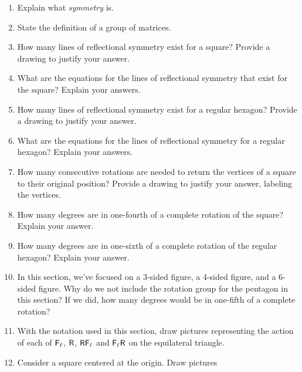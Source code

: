 \problems
\begin{enumerate}
\item Explain what \textit{symmetry} is.
\item State the definition of a group of matrices.
\item How many lines of reflectional symmetry exist for a square?
  Provide a drawing to justify your answer.
\item What are the equations for the lines of reflectional symmetry that exist for
  the square? Explain your answers.
\item How many lines of reflectional symmetry exist for a regular hexagon?  Provide a
  drawing to justify your answer.
\item What are the equations for the lines of reflectional symmetry
  for a regular hexagon?  Explain your answers.
\item How many consecutive rotations are needed to return the vertices
  of a square to their original position? Provide a drawing to justify
  your answer, labeling the vertices.
\item How many degrees are in one-fourth of a complete rotation of the
  square?  Explain your answer.
\item How many degrees are in one-sixth of a complete rotation of the
  regular hexagon?  Explain your answer.
\item In this section, we've focused on a 3-sided figure, a 4-sided
  figure, and a 6-sided figure.  Why do we not include the rotation
  group for the pentagon in this section?  If we did, how many degrees
  would be in one-fifth of a complete rotation?
\item With the notation used in this section, draw pictures representing
  the action of each of $\mathsf{F}_\ell$, $\mathsf{R}$,
  $\mathsf{R}\mathsf{F}_\ell$ and $\mathsf{F}_\ell\mathsf{R}$ on the equilateral
  triangle.
\item Consider a square centered at the origin. Draw pictures

\end{enumerate}
